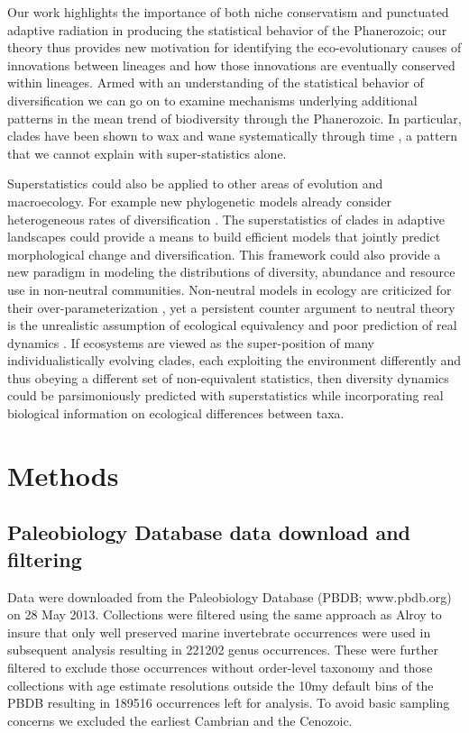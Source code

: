 \documentclass[12pt]{article}
\let\citep=\autocite
\begin{document}
Our work highlights the importance of both niche conservatism and
punctuated adaptive radiation in producing the statistical behavior of
the Phanerozoic; our theory thus provides new motivation for
identifying the eco-evolutionary causes of innovations between
lineages and how those innovations are eventually conserved within
lineages. Armed with an understanding of the statistical behavior of
diversification we can go on to examine mechanisms underlying
additional patterns in the mean trend of biodiversity through the
Phanerozoic. In particular, clades have been shown to wax and wane
systematically through time \citep{liow2007,
  quental2013}, a pattern that we cannot explain with super-statistics
alone.

Superstatistics could also be applied to other areas of evolution and
macroecology.  For example new phylogenetic models already consider
heterogeneous rates of diversification
\citep[e.g.][]{rabosky2006laser}. The superstatistics of clades in
adaptive landscapes could provide a means to build efficient models
that jointly predict morphological change and diversification. This
framework could also provide a new paradigm in modeling the
distributions of diversity, abundance and resource use in non-neutral
communities. Non-neutral models in ecology are criticized for their
over-parameterization \citep{rosindell2011TREE}, yet a persistent
counter argument to neutral theory \citep{hubbell2001} is the
unrealistic assumption of ecological equivalency
\citep{chave2004neutral} and poor prediction of real dynamics
\citep{ricklefs2006neutral}. If ecosystems are viewed as the
super-position of many individualistically evolving clades, each
exploiting the environment differently and thus obeying a different
set of non-equivalent statistics, then diversity dynamics could be
parsimoniously predicted with superstatistics while incorporating real
biological information on ecological differences between taxa.

\section*{Methods}

\subsection*{Paleobiology Database data download and filtering}
Data were downloaded from the Paleobiology Database (PBDB;
www.pbdb.org) on 28 May 2013. Collections were filtered using the same
approach as Alroy \citep{alroy08} to insure that only well preserved
marine invertebrate occurrences were used in subsequent analysis
resulting in 221202 genus occurrences. These were further filtered to
exclude those occurrences without order-level taxonomy and those
collections with age estimate resolutions outside the 10my default
bins of the PBDB resulting in 189516 occurrences left for analysis. To
avoid basic sampling concerns we excluded the earliest Cambrian and
the Cenozoic.
\end{document}
